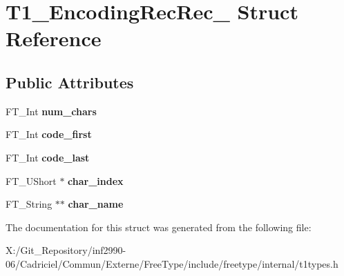 \hypertarget{struct_t1___encoding_rec_rec__}{\section{T1\-\_\-\-Encoding\-Rec\-Rec\-\_\- Struct Reference}
\label{struct_t1___encoding_rec_rec__}
}
\subsection*{Public Attributes}
\begin{DoxyCompactItemize}
\item 
\hypertarget{struct_t1___encoding_rec_rec___af1468d5bad99cccebeb0387713999e9c}{F\-T\-\_\-\-Int {\bfseries num\-\_\-chars}}\label{struct_t1___encoding_rec_rec___af1468d5bad99cccebeb0387713999e9c}

\item 
\hypertarget{struct_t1___encoding_rec_rec___ae21aad8cbb10c8fd94e9f30c60542662}{F\-T\-\_\-\-Int {\bfseries code\-\_\-first}}\label{struct_t1___encoding_rec_rec___ae21aad8cbb10c8fd94e9f30c60542662}

\item 
\hypertarget{struct_t1___encoding_rec_rec___a9be1faadf0ce11d12d3bce600e1f2a9d}{F\-T\-\_\-\-Int {\bfseries code\-\_\-last}}\label{struct_t1___encoding_rec_rec___a9be1faadf0ce11d12d3bce600e1f2a9d}

\item 
\hypertarget{struct_t1___encoding_rec_rec___a0c00a7b5c5ec7ba5eba667252f11f199}{F\-T\-\_\-\-U\-Short $\ast$ {\bfseries char\-\_\-index}}\label{struct_t1___encoding_rec_rec___a0c00a7b5c5ec7ba5eba667252f11f199}

\item 
\hypertarget{struct_t1___encoding_rec_rec___acf21f77cff90336fb9f297799aaf26eb}{F\-T\-\_\-\-String $\ast$$\ast$ {\bfseries char\-\_\-name}}\label{struct_t1___encoding_rec_rec___acf21f77cff90336fb9f297799aaf26eb}

\end{DoxyCompactItemize}


The documentation for this struct was generated from the following file\-:\begin{DoxyCompactItemize}
\item 
X\-:/\-Git\-\_\-\-Repository/inf2990-\/06/\-Cadriciel/\-Commun/\-Externe/\-Free\-Type/include/freetype/internal/t1types.\-h\end{DoxyCompactItemize}
